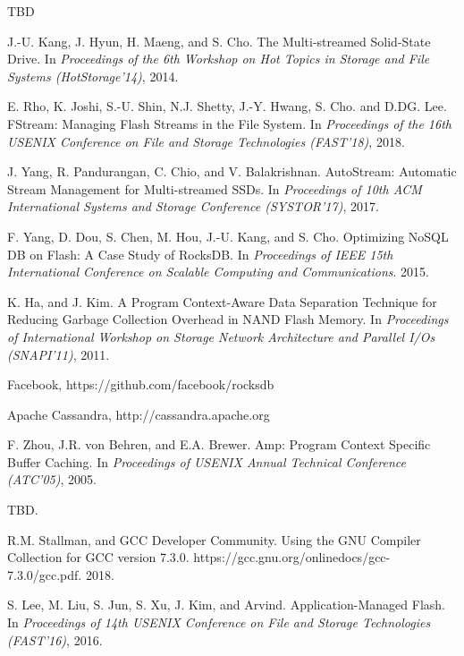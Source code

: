 

\begin{thebibliography}{00}

TBD

J.-U. Kang, J. Hyun, H. Maeng, and S. Cho. The Multi-streamed Solid-State Drive.
In \textit{Proceedings of the 6th Workshop on Hot Topics in Storage and File Systems (HotStorage'14)}, 2014.



E. Rho, K. Joshi, S.-U. Shin, N.J. Shetty, J.-Y. Hwang, S. Cho. and D.DG. Lee. 
FStream: Managing Flash Streams in the File System.
In \textit{Proceedings of the 16th USENIX Conference on File and Storage Technologies (FAST'18)}, 2018.

J. Yang, R. Pandurangan, C. Chio, and V. Balakrishnan.
AutoStream: Automatic Stream Management for Multi-streamed SSDs.
In \textit{Proceedings of 10th ACM International Systems and Storage Conference (SYSTOR'17)}, 2017.

F. Yang, D. Dou, S. Chen, M. Hou, J.-U. Kang, and S. Cho.
Optimizing NoSQL DB on Flash: A Case Study of RocksDB.
In \textit{Proceedings of IEEE 15th International Conference on Scalable Computing
and Communications}. 2015.

K. Ha, and J. Kim.
A Program Context-Aware Data Separation Technique for Reducing Garbage Collection Overhead in NAND Flash Memory.
In \textit{Proceedings of International Workshop on Storage Network Architecture 
and Parallel I/Os (SNAPI'11)}, 2011.

Facebook, https://github.com/facebook/rocksdb

Apache Cassandra, http://cassandra.apache.org

F. Zhou, J.R. von Behren, and E.A. Brewer.
Amp: Program Context Specific Buffer Caching.
In \textit{Proceedings of USENIX Annual Technical Conference (ATC'05)}, 2005.


TBD.

R.M. Stallman, and GCC Developer Community.
Using the GNU Compiler Collection for GCC version 7.3.0.
https://gcc.gnu.org/onlinedocs/gcc-7.3.0/gcc.pdf. 2018.

S. Lee, M. Liu, S. Jun, S. Xu, J. Kim, and Arvind.
Application-Managed Flash.
In \textit{Proceedings of 14th USENIX Conference on File and Storage
Technologies (FAST'16)}, 2016.

\end{thebibliography}
